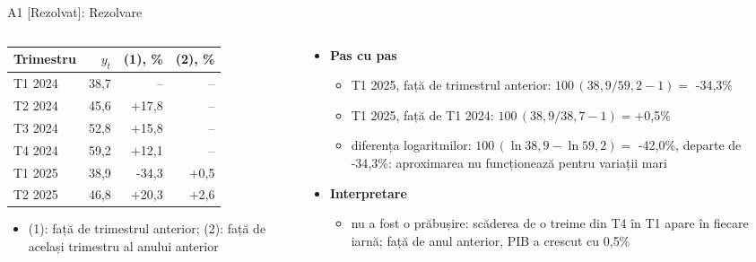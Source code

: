 \begin{frame}{A1 [Rezolvat]: Rezolvare}
\itemsize{\footnotesize}
\begin{columns}[T]
\begin{column}{0.42\textwidth}
\begin{center}
\footnotesize
\begin{tabular}{lrrr}
\toprule
Trimestru & $y_t$ & (1), \% & (2), \% \\
\midrule
T1 2024 & 38{,}7 & -- & -- \\
T2 2024 & 45{,}6 & $+$17{,}8 & -- \\
T3 2024 & 52{,}8 & $+$15{,}8 & -- \\
T4 2024 & 59{,}2 & $+$12{,}1 & -- \\
T1 2025 & 38{,}9 & -34{,}3 & $+$0{,}5 \\
T2 2025 & 46{,}8 & $+$20{,}3 & $+$2{,}6 \\
\bottomrule
\end{tabular}
\end{center}
\begin{itemize}
    \item (1): față de trimestrul anterior; (2): față de același trimestru al anului anterior
\end{itemize}
\end{column}
\begin{column}{0.55\textwidth}
\begin{itemize}
    \item \textbf{Pas cu pas}
    \begin{itemize}
        \item T1 2025, față de trimestrul anterior: $100\,(38{,}9/59{,}2 - 1) = $ -34{,}3\%
        \item T1 2025, față de T1 2024: $100\,(38{,}9/38{,}7 - 1) = +$0{,}5\%
        \item diferența logaritmilor: $100\,(\ln 38{,}9 - \ln 59{,}2) = $ -42{,}0\%, departe de -34{,}3\%: aproximarea nu funcționează pentru variații mari
    \end{itemize}
    \item \textbf{Interpretare}
    \begin{itemize}
        \item nu a fost o prăbușire: scăderea de o treime din T4 în T1 apare în fiecare iarnă; față de anul anterior, PIB a crescut cu 0{,}5\%
    \end{itemize}
\end{itemize}
\end{column}
\end{columns}
\end{frame}

